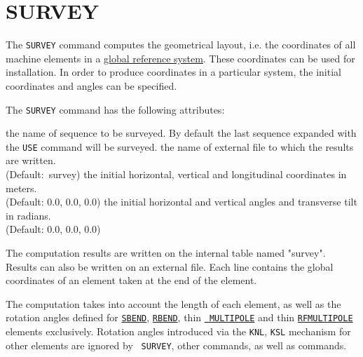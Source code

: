  
\chapter{SURVEY}
\label{chap:survey}

The \texttt{SURVEY} command computes the geometrical layout, i.e. the
coordinates of all machine elements in a 
\hyperref[sec:global_ref]{global reference system}. These
coordinates can be used for installation. In order to produce
coordinates in a particular system, the initial coordinates and angles
can be specified. 


The {\tt SURVEY} command has the following attributes:
\begin{madlist}
   the name of sequence to be surveyed. By default the
  last sequence expanded with the {\tt USE} command will be surveyed.  
    the name of external file to which the results are
  written.\\ (Default:~survey)
   the initial horizontal, vertical and longitudinal
  coordinates in meters.\\ (Default: 0.0, 0.0, 0.0) 
   the initial horizontal and vertical angles
  and transverse tilt in radians.\\ (Default: 0.0, 0.0, 0.0)
\end{madlist}

The computation results are written on the internal table named
"survey". Results can also be written on an external file. Each line
contains the global coordinates of an element taken at the end of the
element.

The computation takes into account the length of each element, as well
as the rotation angles defined for \hyperref[bend_sbend]{\tt SBEND},
\hyperref[bend_rbend]{\tt RBEND}, thin \hyperref[sec:multipole]{\tt
  MULTIPOLE} and thin \hyperref[sec:rfmultipole]{\tt RFMULTIPOLE}
elements exclusively.  Rotation angles introduced via the {\tt KNL},
{\tt KSL} mechanism for other elements are ignored by {\tt
  SURVEY}, other \madx commands, as well as \ptc commands.

